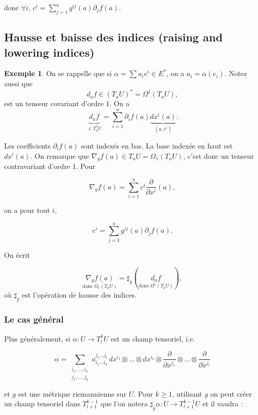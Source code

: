 \documentclass[french]{article}
\theoremstyle{definition}
\newtheorem{protoexemple}{Exemple}[section]
\newenvironment{exemple}
    {\colorlet{shadecolor}{gray!10}\begin{shaded}\begin{protoexemple}}
    {\end{protoexemple}\end{shaded}}
\begin{document}
donc \(\forall i\), \(c^i= \displaystyle \sum_{j=1}^{n} g ^{ij}(a) \partial_j f(a)\).

\subsection {Hausse et baisse des indices (raising and lowering indices)}

\begin{exemple}
On se rappelle que  si \(\alpha = \displaystyle \sum a_i e ^{i} \in E^*\), on a \( a_i = \alpha(e_i)\).  Notez aussi que \[d_a f \in (T_a U)^{*} = \Omega ^{1}(T_a U),\] est un tenseur covariant d'ordre 1. On a
\[\underbrace{d_a f}_{\in T_a ^{*}U} = \displaystyle \sum_{i=1}^{n} \partial_i f(a) \underbrace{d x^{i}(a)}_{(a, e ^{i})}.\]

Les coefficients \(\partial_i f(a)\)  sont indexés en bas.   La base indexée en haut est \(d x^{i}(a)\). On remarque que \(\nabla_gf(a) \in T_a U = \Omega_1(T_a U)\), c'est donc un tenseur contravariant d'ordre 1.  Pour

\[\nabla_g f(a) = \sum_{i=1}^{n} c ^{i} \frac{\partial  }{\partial x ^{i}}(a),\]

on a pour tout \(i\),

\[c ^{i} = \sum_{j=1}^{n} g ^{ij}(a) \partial_j f(a).\]

On écrit

\[\underset{\text{dans } \Omega_1(T_a U)}{\nabla_g f(a)} = {\sharp}_g(\underset{\text{dans } \Omega ^{1}(T_a U)}{d_a f}),\]
o\`u $\sharp_g$ est l'op\'eration de hausse des indices.
\end{exemple}

\subsubsection {Le cas g\'en\'eral}
Plus généralement, si \(\alpha : U \longrightarrow T_l ^{k} U\) est un champ tensoriel, i.e.

\begin{equation}\label{alpha-tenseur}
\alpha = \sum_{\substack{i_1, \dots, i _{k}\\ j_1, \dots, j_k}} a ^{j_1 \dots j_l}_{i_1 \dots i_k} \, d x^{i_1} \otimes \dots \otimes d x^{i_k} \otimes \frac{\partial  }{\partial x ^{j_1}} \otimes \dots \otimes \frac{\partial  }{\partial x ^{j_l}}
\end{equation}

et \(g\) est une métrique riemannienne sur $U$. Pour \(k \geq 1\), utilisant  \(g\)  on peut créer un champ tensoriel dans \(T ^{k-1}_{l+1}\)   que l'on notera \({\sharp}_g\alpha : U \longrightarrow T ^{k-1}_{l+1} U\) et il vaudra :
\end{document}
